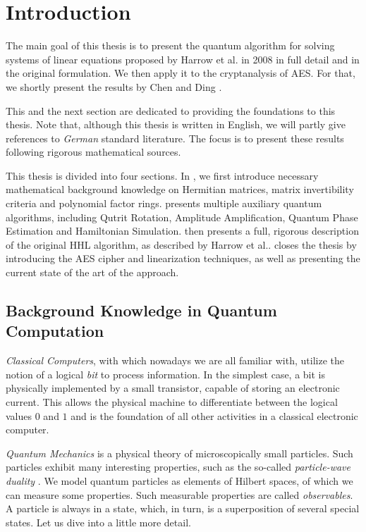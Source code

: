 \section{Introduction} \label{introduction}

The main goal of this thesis is to present the quantum algorithm for solving systems of linear equations proposed by Harrow et al. \cite{Harrow2008} in 2008 in full detail and in the original formulation. We then apply it to the cryptanalysis of AES. For that, we shortly present the results by Chen \cite{Chen2017} and Ding \cite{Ding2021}.

This and the next section are dedicated to providing the foundations to this thesis. Note that, although this thesis is written in English, we will partly give references to \emph{German} standard literature. The focus is to present these results following rigorous mathematical sources.

This thesis is divided into four sections. In , we first introduce necessary mathematical background knowledge on Hermitian matrices, matrix invertibility criteria and polynomial factor rings.  presents multiple auxiliary quantum algorithms, including Qutrit Rotation, Amplitude Amplification, Quantum Phase Estimation and Hamiltonian Simulation.  then presents a full, rigorous description of the original HHL algorithm, as described by Harrow et al..  closes the thesis by introducing the AES cipher and linearization techniques, as well as presenting the current state of the art of the approach.

\subsection{Background Knowledge in Quantum Computation } \label{intro_to_quant_comp}

\emph{Classical Computers}, with which nowadays we are all familiar with, utilize the notion of a logical \emph{bit} to process information. In the simplest case, a bit is physically implemented by a small transistor, capable of storing an electronic current. This allows the physical machine to differentiate between the logical values \(0\) and \(1\) and is the foundation of all other activities in a classical electronic computer.

\phantom{}

\emph{Quantum Mechanics} is a physical theory of microscopically small particles. Such particles exhibit many interesting properties, such as the so-called \emph{particle-wave duality} \cite[pp. 4-8]{Griffiths2018}. We model quantum particles as elements of Hilbert spaces, of which we can measure some properties. Such measurable properties are called \emph{observables}. A particle is always in a state, which, in turn, is a superposition of several special states. Let us dive into a little more detail.

